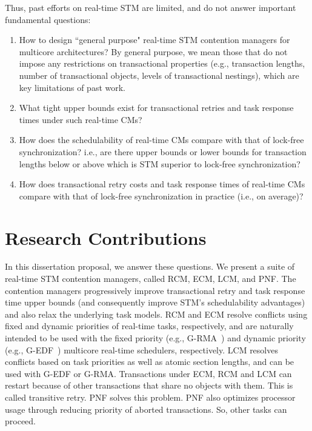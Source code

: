 \documentclass[12pt,english]{report}
\begin{document}
Thus, past efforts on real-time STM are limited, and do not answer important fundamental questions:
\begin{enumerate}[(1)]
\item How to design ``general purpose" real-time STM contention managers for multicore architectures? By general purpose, we mean those that do not impose any restrictions on transactional properties (e.g., transaction lengths, number of transactional objects, levels of transactional nestings), which are key limitations of past work. 
\item What tight upper bounds exist for transactional retries and task response times under such real-time CMs?
\item How does the schedulability of real-time CMs compare with that of lock-free synchronization? i.e., are there upper bounds or lower bounds for transaction lengths below or above which is STM superior to lock-free synchronization?
\item How does transactional retry costs and task response times of real-time CMs compare with that of lock-free synchronization in practice (i.e., on average)?
\end{enumerate}

\section{Research Contributions}

In this dissertation proposal, we answer these questions. We present a suite of real-time STM contention managers, called RCM, ECM, LCM, and PNF. The contention managers progressively improve transactional retry and task response time upper  bounds (and consequently improve STM's schedulability advantages) and also relax the underlying task models. RCM and ECM resolve conflicts using fixed and dynamic priorities of real-time tasks, respectively, and are naturally intended to be used with the fixed priority (e.g., G-RMA~\cite{buttazzo2005hard}) and dynamic priority (e.g., G-EDF~\cite{buttazzo2005hard}) multicore real-time schedulers, respectively. LCM resolves conflicts based on task priorities as well as atomic section lengths, and can be used with G-EDF or G-RMA. Transactions under ECM, RCM and LCM can restart because of other transactions that share no objects with them. This is called transitive retry. PNF solves this problem. PNF also optimizes processor usage through reducing priority of aborted transactions. So, other tasks can proceed.
\end{document}
